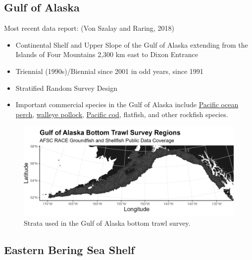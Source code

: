 \documentclass[
  letterpaper,
  oneside,
  open=any]{scrbook}
\providecommand{\tightlist}{%
  \setlength{\itemsep}{0pt}\setlength{\parskip}{0pt}}\usepackage{longtable,booktabs,array}
\begin{document}
\hypertarget{gulf-of-alaska}{%
\subsection{\texorpdfstring{\textbf{Gulf of
Alaska}}{Gulf of Alaska}}\label{gulf-of-alaska}}

Most recent data report: (Von Szalay and Raring, 2018)

\begin{itemize}
\tightlist
\item
  Continental Shelf and Upper Slope of the Gulf of Alaska extending from
  the Islands of Four Mountains 2,300 km east to Dixon Entrance
\item
  Triennial (1990s)/Biennial since 2001 in odd years, since 1991
\item
  Stratified Random Survey Design
\item
  Important commercial species in the Gulf of Alaska include
  \href{https://www.fisheries.noaa.gov/species/pacific-ocean-perch}{Pacific
  ocean perch},
  \href{https://www.fisheries.noaa.gov/species/alaska-pollock}{walleye
  pollock},
  \href{https://www.fisheries.noaa.gov/species/pacific-cod}{Pacific
  cod}, flatfish, and other rockfish species.
\end{itemize}

\begin{figure}

{\centering \includegraphics[width=7in,height=\textheight]{content/../img/survey_plot_goa.png}

}

\caption{Strata used in the Gulf of Alaska bottom trawl survey.}

\end{figure}

\hypertarget{eastern-bering-sea-shelf}{%
\subsection{\texorpdfstring{\textbf{Eastern Bering Sea
Shelf}}{Eastern Bering Sea Shelf}}\label{eastern-bering-sea-shelf}}
\end{document}
